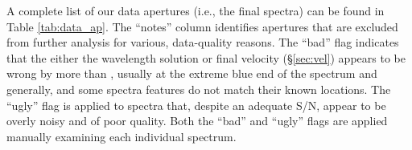 A complete list of our data apertures (i.e., the final spectra) can be
found in Table \ref{tab:data_ap}. The ``notes'' column identifies
apertures that are excluded from further analysis for various,
data-quality reasons. The ``bad'' flag indicates that the either the
wavelength solution or final velocity (\S\ref{sec:vel}) appears
to be wrong by more than , usually at the extreme
blue end of the spectrum and generally, and some spectra features do
not match their known locations. The ``ugly'' flag is applied to
spectra that, despite an adequate S/N, appear to be overly noisy and
of poor quality. Both the ``bad'' and ``ugly'' flags are applied
manually examining each individual spectrum.

